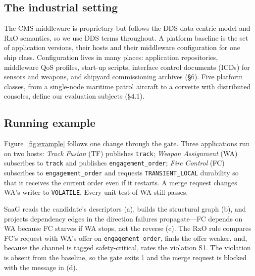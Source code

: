 \documentclass[sigconf,screen]{acmart}
\begin{document}
\subsection{The industrial setting}
The CMS middleware is proprietary but follows the DDS data-centric model and RxO semantics, so we use DDS terms throughout. A platform baseline is the set of application versions, their hosts and their middleware configuration for one ship class. Configuration lives in many places: application repositories, middleware QoS profiles, start-up scripts, interface control documents (ICDs) for sensors and weapons, and shipyard commissioning archives (\S6). Five platform classes, from a single-node maritime patrol aircraft to a corvette with distributed consoles, define our evaluation subjects (\S4.1).

\subsection{Running example}
Figure~\ref{fig:example} follows one change through the gate. Three applications run on two hosts: \emph{Track Fusion} (TF) publishes \texttt{track}; \emph{Weapon Assignment} (WA) subscribes to \texttt{track} and publishes \texttt{engagement\_order}; \emph{Fire Control} (FC) subscribes to \texttt{engagement\_order} and requests \texttt{TRANSIENT\_LOCAL} durability so that it receives the current order even if it restarts. A merge request changes WA's writer to \texttt{VOLATILE}. Every unit test of WA still passes.

SaaG reads the candidate's descriptors (a), builds the structural graph (b), and projects dependency edges in the direction failures propagate---FC depends on WA because FC starves if WA stops, not the reverse (c). The RxO rule compares FC's request with WA's offer on \texttt{engagement\_order}, finds the offer weaker, and, because the channel is tagged safety-critical, rates the violation S1. The violation is absent from the baseline, so the gate exits 1 and the merge request is blocked with the message in (d).
\end{document}
